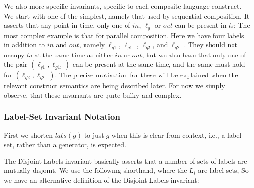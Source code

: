 We also more specific invariants, specific to each composite language construct.
We start with one of the simplest,
namely that used by sequential composition.
It asserts that any point in time,
only one of $in$, $\ell_g$ or $out$ can be present in $ls$:
The most complex example is that for parallel composition.
Here we have four labels in addition to $in$ and $out$,
namely $\ell_{g1}$, $\ell_{g1:}$, $\ell_{g2}$, and $\ell_{g2:}$.
They should not occupy $ls$ at the same time as either $in $ or $out$,
but we also have that only one of the pair $(\ell_{g1},\ell_{g1:})$
can be present at the same time,
and the same must hold  for $(\ell_{g2},\ell_{g2:})$.
The precise motivation for these will be explained when the relevant
construct semantics are being described later.
For now we simply observe,
that these invariants are quite bulky and complex.



\subsubsection{Label-Set Invariant Notation}

First we shorten $labs(g)$ to just $g$ when this is clear from context,
i.e., a label-set, rather than a generator, is expected.

The Disjoint Labels invariant basically asserts
that a number of sets of labels are mutually disjoint.
We use the following shorthand, where the $L_i$ are label-sets,
So we have an alternative definition of the Disjoint Labels invariant:

